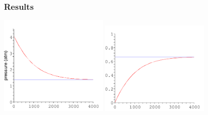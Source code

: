 \documentclass[10pt]{beamer}
\begin{document}
\begin{frame}
  \frametitle{Results}

\centerline{
  \includegraphics[width=0.4\textwidth]{pressure.pdf}
  \qquad
  \includegraphics[width=0.4\textwidth]{efficiency.pdf}
}

\end{frame}
\end{document}
